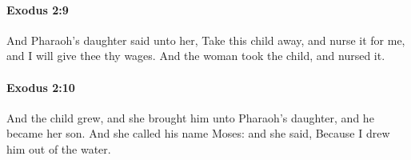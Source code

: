 		\paragraph{Exodus 2:9} %
			\label{EXODUS-2-9}

			And Pharaoh's daughter said unto her, Take this child away, and nurse it for me, and I will give thee thy wages. And the woman took the child, and nursed it.


		\paragraph{Exodus 2:10} %
			\label{EXODUS-2-10}

			And the child grew, and she brought him unto Pharaoh's daughter, and he became her son. And she called his name Moses: and she said, Because I drew him out of the water.


